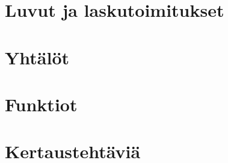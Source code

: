\part{Luvut ja laskutoimitukset}
    
    
    
    
    
    
    
    
    

\part{Yhtälöt}
    
    
    
    
    
    

\part{Funktiot}
    
    
    
    
    

\part{Kertaustehtäviä}
    
    
    
